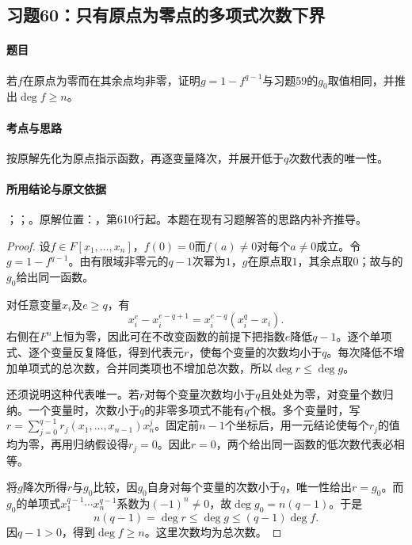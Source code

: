\subsection{习题60：只有原点为零点的多项式次数下界}

\label{ex:3:60}

\paragraph{题目}

若$f$在原点为零而在其余点均非零，证明$g=1-f^{q-1}$与习题59的$g_0$取值相同，并推出$\deg f\geqslant n$。

\paragraph{考点与思路}

按原解先化为原点指示函数，再逐变量降次，并展开低于$q$次数代表的唯一性。

\paragraph{所用结论与原文依据}

；；。原解位置：，第610行起。本题在现有习题解答的思路内补齐推导。


\begin{proof}

设$f\in F[x_1,\ldots,x_n]$，$f(0)=0$而$f(a)\ne0$对每个$a\ne0$成立。令$g=1-f^{q-1}$。由有限域非零元的$q-1$次幂为$1$，$g$在原点取$1$，其余点取$0$；故与的$g_0$给出同一函数。

对任意变量$x_i$及$e\ge q$，有
\[
x_i^e-x_i^{e-q+1}=x_i^{e-q}(x_i^q-x_i).
\]
右侧在$F^n$上恒为零，因此可在不改变函数的前提下把指数$e$降低$q-1$。逐个单项式、逐个变量反复降低，得到代表元$r$，使每个变量的次数均小于$q$。每次降低不增加单项式的总次数，合并同类项也不增加总次数，所以$\deg r\le\deg g$。

还须说明这种代表唯一。若$r$对每个变量次数均小于$q$且处处为零，对变量个数归纳。一个变量时，次数小于$q$的非零多项式不能有$q$个根。多个变量时，写$r=\sum_{j=0}^{q-1}r_j(x_1,\ldots,x_{n-1})x_n^j$。固定前$n-1$个坐标后，用一元结论使每个$r_j$的值均为零，再用归纳假设得$r_j=0$。因此$r=0$，两个给出同一函数的低次数代表必相等。

将$g$降次所得$r$与$g_0$比较，因$g_0$自身对每个变量的次数小于$q$，唯一性给出$r=g_0$。而$g_0$的单项式$x_1^{q-1}\cdots x_n^{q-1}$系数为$(-1)^n\ne0$，故$\deg g_0=n(q-1)$。于是
\[
n(q-1)=\deg r\le\deg g\le(q-1)\deg f.
\]
因$q-1>0$，得到$\deg f\ge n$。这里次数均为总次数。

\end{proof}

